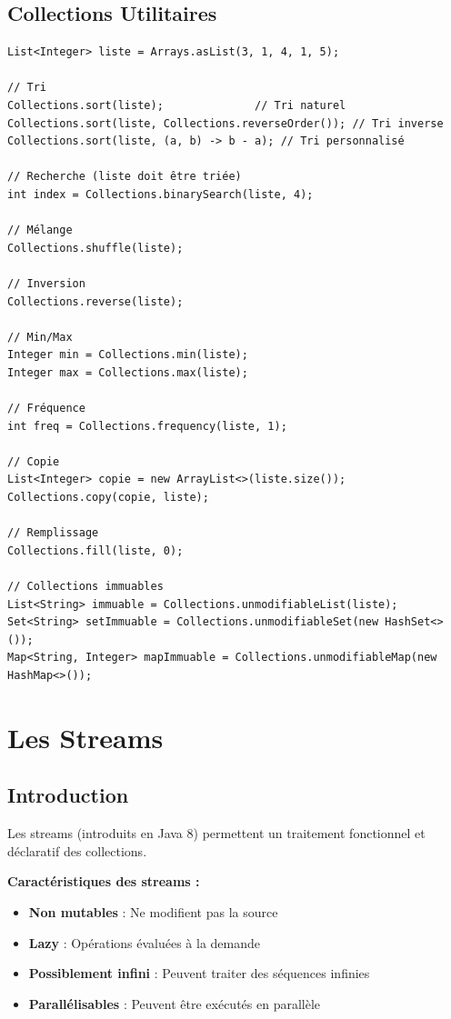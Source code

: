 \documentclass[11pt,a4paper]{article}
\begin{document}
\subsection{Collections Utilitaires}

\begin{lstlisting}
List<Integer> liste = Arrays.asList(3, 1, 4, 1, 5);

// Tri
Collections.sort(liste);              // Tri naturel
Collections.sort(liste, Collections.reverseOrder()); // Tri inverse
Collections.sort(liste, (a, b) -> b - a); // Tri personnalisé

// Recherche (liste doit être triée)
int index = Collections.binarySearch(liste, 4);

// Mélange
Collections.shuffle(liste);

// Inversion
Collections.reverse(liste);

// Min/Max
Integer min = Collections.min(liste);
Integer max = Collections.max(liste);

// Fréquence
int freq = Collections.frequency(liste, 1);

// Copie
List<Integer> copie = new ArrayList<>(liste.size());
Collections.copy(copie, liste);

// Remplissage
Collections.fill(liste, 0);

// Collections immuables
List<String> immuable = Collections.unmodifiableList(liste);
Set<String> setImmuable = Collections.unmodifiableSet(new HashSet<>());
Map<String, Integer> mapImmuable = Collections.unmodifiableMap(new HashMap<>());
\end{lstlisting}

\newpage

\section{Les Streams}

\subsection{Introduction}

Les streams (introduits en Java 8) permettent un traitement fonctionnel et déclaratif des collections.

\begin{importantbox}
\textbf{Caractéristiques des streams :}
\begin{itemize}
    \item \textbf{Non mutables} : Ne modifient pas la source
    \item \textbf{Lazy} : Opérations évaluées à la demande
    \item \textbf{Possiblement infini} : Peuvent traiter des séquences infinies
    \item \textbf{Parallélisables} : Peuvent être exécutés en parallèle
\end{itemize}
\end{importantbox}
\end{document}
